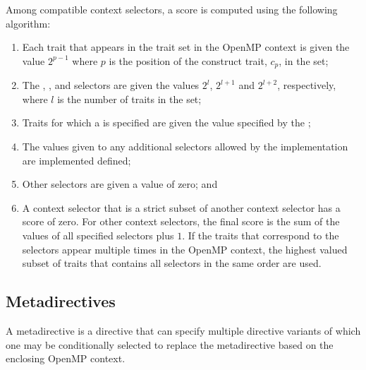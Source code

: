 Among compatible context selectors, a score is computed using the following algorithm:

\begin{enumerate}
\item Each trait that appears in the  trait set in the OpenMP context 
      is given the value $2^{p-1}$ where $p$ is the position of the construct trait,
      $c_{p}$, in the set;
\item The , , and  selectors are given the
      values $2^{l}$, $2^{l+1}$ and $2^{l+2}$, respectively, where $l$ is 
      the number of traits in the  set;
\item Traits for which a  is specified are given the value specified by the
       ; 
\item The values given to any additional selectors allowed by the implementation 
      are implemented defined;
\item Other selectors are given a value of zero; and
\item A context selector that is a strict subset of another context selector
      has a score of zero. For other context selectors, the final score is the
      sum of the values of all specified selectors plus $1$. If the traits
      that correspond to the  selectors appear multiple times 
      in the OpenMP context, the highest valued subset of traits that contains 
      all selectors in the same order are used.
\end{enumerate}



\subsection{Metadirectives}
\label{subsec:Metadirective Meta-Directive}
\summary
A metadirective is a directive that can specify multiple directive variants
of which one may be conditionally selected to replace the metadirective based
on the enclosing OpenMP context.

